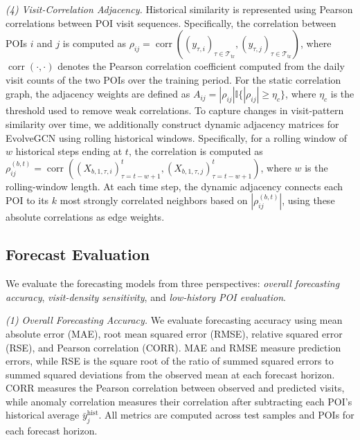 \documentclass[preprint,authoryear,11pt]{elsarticle}
\theoremstyle{definition}
\begin{document}
\textit{(4) Visit-Correlation Adjacency.}
Historical similarity is represented using Pearson correlations between POI visit sequences.
Specifically, the correlation between POIs \(i\) and \(j\) is computed as
\(\rho_{ij}=\operatorname{corr}((y_{\tau,i})_{\tau\in\mathcal{T}_{\mathrm{tr}}},(y_{\tau,j})_{\tau\in\mathcal{T}_{\mathrm{tr}}})\),
where \(\operatorname{corr}(\cdot,\cdot)\) denotes the Pearson correlation coefficient computed from the daily visit counts of the two POIs over the training period.
For the static correlation graph, the adjacency weights are defined as
\(A_{ij}=|\rho_{ij}|\mathbb{I}\{|\rho_{ij}|\geq\eta_c\}\),
where \(\eta_c\) is the threshold used to remove weak correlations.
To capture changes in visit-pattern similarity over time, we additionally construct dynamic adjacency matrices for EvolveGCN using rolling historical windows.
Specifically, for a rolling window of \(w\) historical steps ending at \(t\), the correlation is computed as
\(\rho_{ij}^{(b,t)}=\operatorname{corr}((X_{b,1,\tau,i})_{\tau=t-w+1}^{t},(X_{b,1,\tau,j})_{\tau=t-w+1}^{t})\),
where \(w\) is the rolling-window length.
At each time step, the dynamic adjacency connects each POI to its \(k\) most strongly correlated neighbors based on \(|\rho_{ij}^{(b,t)}|\), using these absolute correlations as edge weights.

\subsection{Forecast Evaluation}
\label{subsec:low_history_method}

We evaluate the forecasting models from three perspectives: \textit{overall forecasting accuracy}, \textit{visit-density sensitivity}, and \textit{low-history POI evaluation}.

\textit{(1) Overall Forecasting Accuracy.}
We evaluate forecasting accuracy using mean absolute error (MAE), root mean squared error (RMSE), relative squared error (RSE), and Pearson correlation (CORR).
MAE and RMSE measure prediction errors, while RSE is the square root of the ratio of summed squared errors to summed squared deviations from the observed mean at each forecast horizon.
CORR measures the Pearson correlation between observed and predicted visits, while anomaly correlation measures their correlation after subtracting each POI's historical average \(\bar y_j^{\mathrm{hist}}\).
All metrics are computed across test samples and POIs for each forecast horizon.
\end{document}

